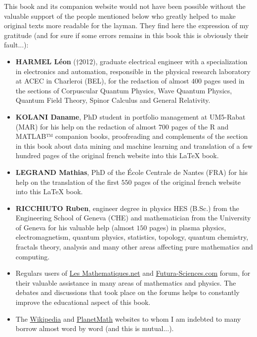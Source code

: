 	This book and its companion website would not have been possible without the valuable support of the people mentioned below who greatly helped to make original texts more readable for the layman. They find here the expression of my gratitude (and for sure if some errors remains in this book this is obviously their fault...):
	
	\begin{itemize}		
		\item \textbf{HARMEL Léon }(†2012), graduate electrical engineer with a specialization in electronics and automation, responsible in the physical research laboratory at ACEC in Charleroi (BEL), for the redaction of almost $400$ pages used in the sections of Corpuscular Quantum Physics, Wave Quantum Physics,  Quantum Field Theory, Spinor Calculus and General Relativity.
		
		\item \textbf{KOLANI Daname}, PhD student in portfolio management at UM5-Rabat (MAR) for his help on the redaction of almost $700$ pages of the R and MATLAB™ companion books, proofreading and complements of the section in this book about data mining and machine learning and translation of a few hundred pages of the original french website into this \LaTeX{} book.
		
		\item \textbf{LEGRAND Mathias}, PhD of the École Centrale de Nantes (FRA) for his help on the translation of the first $550$ pages of the original french website into this \LaTeX{} book.
		
		\item \textbf{RICCHIUTO Ruben}, engineer degree in physics HES (B.Sc.) from the Engineering School of Geneva (CHE) and mathematician from the University of Geneva for his valuable help (almost $150$ pages) in plasma physics, electromagnetism, quantum physics, statistics, topology, quantum chemistry, fractals theory, analysis and many other areas affecting pure mathematics and computing.
		
		\item Regulars users of \href{http://www.les-mathematiques.net}{{\color{blue} Les Mathematiques.net}} and \href{http://www.futura-sciences.com}{{\color{blue} Futura-Sciences.com}} forum, for their valuable assistance in many areas of mathematics and physics. The debates and discussions that took place on the forums helps to constantly improve the educational aspect of this book.
		
		\item The \href{http://www.wikipedia.com}{{\color{blue} Wikipedia}} and \href{http://www.planetmath.com}{{\color{blue} PlanetMath}} websites to whom I am indebted to many borrow almost word by word (and this is mutual...).
		

\end{itemize}
